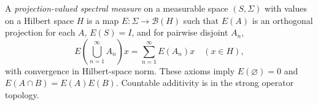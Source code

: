 
A \emph{projection-valued spectral measure} on a measurable space $(S,\Sigma)$ with values on a Hilbert space $H$ is a map $E:\Sigma\to\mathcal B(H)$ such that $E(A)$ is an orthogonal projection for each $A$, $E(S)=I$, and for pairwise disjoint $A_n$,
\[
E\!\left(\bigcup_{n=1}^\infty A_n\right)x=\sum_{n=1}^\infty E(A_n)x\quad(x\in H),
\]
with convergence in Hilbert-space norm. These axioms imply $E(\varnothing)=0$ and $E(A\cap B)=E(A)E(B)$. Countable additivity is in the strong operator topology.
